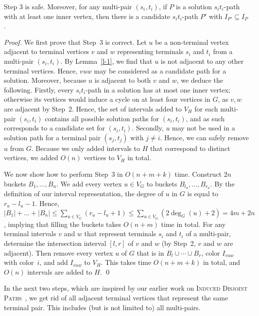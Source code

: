\documentclass{llncs}
\newcommand{\problemIDP}{\textsc{Induced Disjoint Paths}}
\begin{document}
\begin{lemma}\label{l-3}
Step 3 is safe. Moreover, for any multi-pair $(s_i,t_i)$, if $P$ is a solution $s_it_i$-path with at least one inner vertex, then there is a candidate $s_it_i$-path $P'$ with $I_{P'} \subseteq I_{P}$.
\end{lemma}

\begin{proof}
We first prove that Step~3 is correct. Let $u$ be a non-terminal vertex 
adjacent to terminal vertices $v$ and $w$  representing terminals $s_i$ and $t_i$ from a multi-pair $(s_i,t_i)$.
By Lemma~\ref{l-1}, we find that $u$ is not adjacent to any other terminal vertices. Hence, $vuw$ may be considered as 
a candidate path for a solution. Moreover, because $u$ is adjacent to both $v$ and $w$, we deduce the following.
Firstly, every $s_it_i$-path in a solution has at most one inner vertex; otherwise its vertices would induce a cycle on at least four 
vertices in $G$, as $v,w$ are adjacent by Step~2. Hence, the set of intervals added to $V_H$ for each multi-pair $(s_i,t_i)$ contains all
possible solution paths for $(s_i,t_i)$, and as such corresponds to a candidate set for $(s_i,t_i)$.
Secondly, $u$ may not be used
in a solution path for a terminal pair $(s_j,t_j)$ with $j\neq i$. Hence, we can safely remove $u$ from $G$.
Because we only added intervals to $H$ that correspond to distinct vertices,  we added $O(n)$ vertices to $V_H$ in total.

We now show how to perform Step~3 in $O(n+m+k)$ time. 
Construct $2n$ buckets $B_1,\ldots,B_n$. We add every vertex $u\in V_G$ to buckets $B_{l_u},\ldots,B_{r_u}$. 
By the definition of our interval representation, the degree of $u$ in $G$ is equal to~$r_u-l_u-1$. 
Hence, $|B_1|+\ldots +|B_n|\leq \sum_{u\in V_G}(r_u-l_u+1)\leq\sum_{u\in V_G}(2\deg_G(u)+2)=4m+2n$, implying that filling the buckets takes $O(n+m)$ time in total.
For any terminal intervals $v$ and $w$ that represent terminals $s_i$ and $t_i$ of a multi-pair, determine the intersection interval $[l,r]$ of $v$ and $w$ (by Step~2, $v$ and $w$ are adjacent). Then remove every vertex $u$ of $G$ that is in $B_l\cup \cdots \cup B_r$, color $I_{vuw}$ with color~$i$, and add $I_{vuw}$ to $V_H$. 
This takes time $O(n+m+k)$ in total, and $O(n)$ intervals are added to $H$. 
\qed
\end{proof}

In the next two steps, which are inspired by our earlier work on \problemIDP~\cite{GPV12,GPV12b}, we get rid of all adjacent terminal vertices that represent the same terminal pair. This includes (but is not limited to) all multi-pairs.
\end{document}
